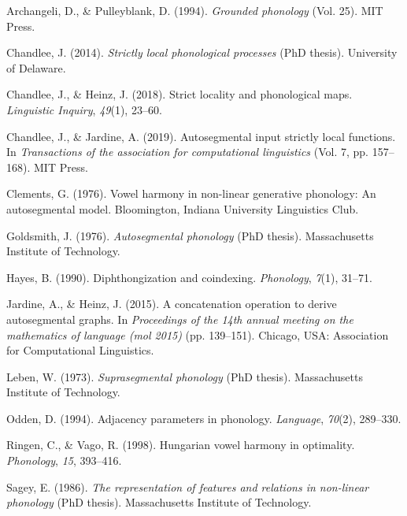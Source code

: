 \documentclass[,doc,floatsintext]{apa6}
\theoremstyle{definition}
\theoremstyle{definition}
\theoremstyle{definition}
\theoremstyle{remark}
\begin{document}
\begingroup
\setlength{\parindent}{-0.5in} \setlength{\leftskip}{0.5in}

\hypertarget{refs}{}
\hypertarget{ref-archangelipulleyblank1994}{}
Archangeli, D., \& Pulleyblank, D. (1994). \emph{Grounded phonology}
(Vol. 25). MIT Press.

\hypertarget{ref-chandlee2014}{}
Chandlee, J. (2014). \emph{Strictly local phonological processes}
(PhD thesis). University of Delaware.

\hypertarget{ref-chandleeheinz2018}{}
Chandlee, J., \& Heinz, J. (2018). Strict locality and phonological
maps. \emph{Linguistic Inquiry}, \emph{49}(1), 23--60.

\hypertarget{ref-chandleejardineaisl}{}
Chandlee, J., \& Jardine, A. (2019). Autosegmental input strictly local
functions. In \emph{Transactions of the association for computational
linguistics} (Vol. 7, pp. 157--168). MIT Press.

\hypertarget{ref-Clements1976}{}
Clements, G. (1976). Vowel harmony in non-linear generative phonology:
An autosegmental model. Bloomington, Indiana University Linguistics
Club.

\hypertarget{ref-Goldsmith1976}{}
Goldsmith, J. (1976). \emph{Autosegmental phonology} (PhD thesis).
Massachusetts Institute of Technology.

\hypertarget{ref-hayes1990}{}
Hayes, B. (1990). Diphthongization and coindexing. \emph{Phonology},
\emph{7}(1), 31--71.

\hypertarget{ref-jardineheinz2015}{}
Jardine, A., \& Heinz, J. (2015). A concatenation operation to derive
autosegmental graphs. In \emph{Proceedings of the 14th annual meeting on
the mathematics of language (mol 2015)} (pp. 139--151). Chicago, USA:
Association for Computational Linguistics.

\hypertarget{ref-leben1973}{}
Leben, W. (1973). \emph{Suprasegmental phonology} (PhD thesis).
Massachusetts Institute of Technology.

\hypertarget{ref-odden1994}{}
Odden, D. (1994). Adjacency parameters in phonology. \emph{Language},
\emph{70}(2), 289--330.

\hypertarget{ref-ringenvago1998}{}
Ringen, C., \& Vago, R. (1998). Hungarian vowel harmony in optimality.
\emph{Phonology}, \emph{15}, 393--416.

\hypertarget{ref-sagey1986}{}
Sagey, E. (1986). \emph{The representation of features and relations in
non-linear phonology} (PhD thesis). Massachusetts Institute of
Technology.

\endgroup
\end{document}
